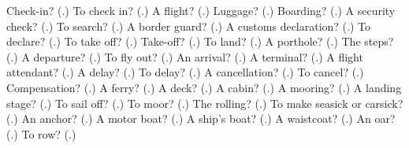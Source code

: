 \begin{tcolorbox}[breakable,colback=teal!4,colframe=teal!35!black,title={Before you move on}]
Check-in? (\textbf{}.) To check in? (\textbf{}.) A flight? (\textbf{}.) Luggage? (\textbf{}.) Boarding? (\textbf{}.) A security check? (\textbf{}.) To search? (\textbf{}.) A border guard? (\textbf{}.) A customs declaration? (\textbf{}.) To declare? (\textbf{}.) To take off? (\textbf{}.) Take-off? (\textbf{}.) To land? (\textbf{}.) A porthole? (\textbf{}.) The steps? (\textbf{}.) A departure? (\textbf{}.) To fly out? (\textbf{}.) An arrival? (\textbf{}.) A terminal? (\textbf{}.) A flight attendant? (\textbf{}.) A delay? (\textbf{}.) To delay? (\textbf{}.) A cancellation? (\textbf{}.) To cancel? (\textbf{}.) Compensation? (\textbf{}.) A ferry? (\textbf{}.) A deck? (\textbf{}.) A cabin? (\textbf{}.) A mooring? (\textbf{}.) A landing stage? (\textbf{}.) To sail off? (\textbf{}.) To moor? (\textbf{}.) The rolling? (\textbf{}.) To make seasick or carsick? (\textbf{}.) An anchor? (\textbf{}.) A motor boat? (\textbf{}.) A ship's boat? (\textbf{}.) A waistcoat? (\textbf{}.) An oar? (\textbf{}.) To row? (\textbf{}.)
\end{tcolorbox}
